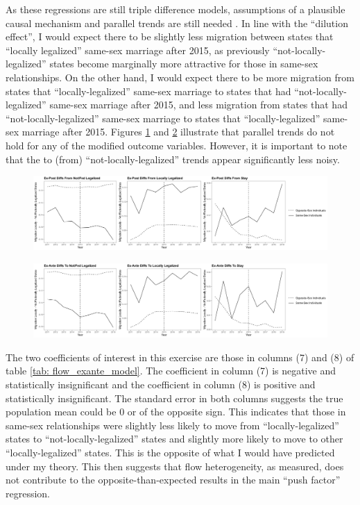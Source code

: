 \documentclass[12pt,letterpaper]{article}
\begin{document}
As these regressions are still triple difference models, assumptions of a plausible causal mechanism and parallel trends are still needed \citep{24, 25}. In line with the “dilution effect”, I would expect there to be slightly less migration between states that “locally legalized” same-sex marriage after 2015, as previously “not-locally-legalized” states become marginally more attractive for those in same-sex relationships. On the other hand, I would expect there to be more migration from states that “locally-legalized” same-sex marriage to states that had “not-locally-legalized” same-sex marriage after 2015, and less migration from states that had “not-locally-legalized” same-sex marriage to states that “locally-legalized” same-sex marriage after 2015. Figures \ref{fig: flows_post_diffs} and \ref{fig: flows_ante_diffs} illustrate that parallel trends do not hold for any of the modified outcome variables. However, it is important to note that the to (from) “not-locally-legalized” trends appear significantly less noisy.

\begin{centering}
\begin{figure}
    \includegraphics[width=1\linewidth]{outputs/summary_stats/flows_post_diffs.png}
    \caption{}
    \label{fig: flows_post_diffs}
\end{figure}

\begin{figure}
    \includegraphics[width=1\linewidth]{outputs/summary_stats/flows_ante_diffs.png}
    \caption{}
    \label{fig: flows_ante_diffs}
\end{figure}
\end{centering}

 The two coefficients of interest in this exercise are those in columns (7) and (8) of table \ref{tab: flow_exante_model}. The coefficient in column (7) is negative and statistically insignificant and the coefficient in column (8) is positive and statistically insignificant. The standard error in both columns suggests the true population mean could be 0 or of the opposite sign. This indicates that those in same-sex relationships were slightly less likely to move from “locally-legalized” states to “not-locally-legalized” states and slightly more likely to move to other “locally-legalized” states. This is the opposite of what I would have predicted under my theory. This then suggests that flow heterogeneity, as measured, does not contribute to the opposite-than-expected results in the main “push factor” regression.
\end{document}
